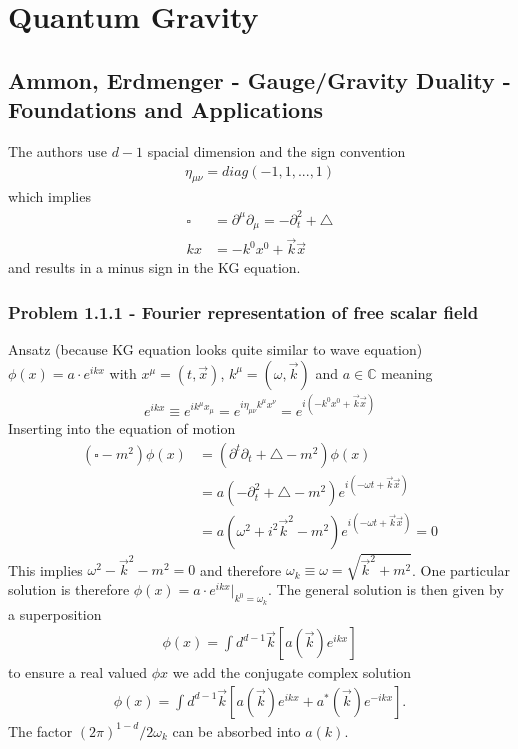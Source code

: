 \documentclass[10pt,a4paper]{article}
\theoremstyle{definition}
\begin{document}
\newpage
\section{Quantum Gravity}
\subsection{{\sc Ammon, Erdmenger} - Gauge/Gravity Duality - Foundations and Applications}
The authors use $d-1$ spacial dimension and the sign convention 
\begin{align}
\eta_{\mu\nu}=diag(-1,1,...,1)
\end{align}
which implies 
\begin{align}
    \square&=\partial^\mu\partial_\mu=-\partial_t^2+\triangle\\
    kx&=-k^0x^0+\vec{k}\vec{x}
\end{align}
and results in a minus sign in the KG equation.

\subsubsection{Problem 1.1.1 - Fourier representation of free scalar field}
Ansatz (because KG equation looks quite similar to wave equation) $\phi(x)=a\cdot e^{ikx}$ with $x^\mu=(t,\vec{x})$, $k^\mu=(\omega,\vec{k})$ and $a\in\mathbb{C}$ meaning 
\begin{align}
    e^{ikx}\equiv e^{ik^{\mu}x_{\mu}}=e^{i\eta_{\mu\nu}k^{\mu}x^{\nu}}=e^{i(-k^0x^0+\vec{k}\vec{x})}
\end{align}
Inserting into the equation of motion
\begin{align}
    (\square - m^2)\phi(x)&=(\partial^t\partial_t + \triangle - m^2)\phi(x)\\
    &=a(-\partial_t^2 + \triangle - m^2)e^{i(-\omega t+\vec{k}\vec{x})}\\
    &=a\left(\omega^2 + i^2\vec{k}^2 - m^2\right)e^{i(-\omega t+\vec{k}\vec{x})}=0 
\end{align}
This implies $\omega^2-\vec{k}^2-m^2=0$ and therefore $\omega_k\equiv\omega=\sqrt{\vec{k}^2+m^2}$. One particular solution is therefore $\phi(x)=a\cdot e^{ikx}|_{k^0=\omega_k}$. The general solution is then given by a superposition
\begin{align}
    \phi(x)=\int d^{d-1}\vec{k}\left[a(\vec{k})e^{ikx}\right]
\end{align}
to ensure a real valued $\phi{x}$ we add the conjugate complex solution
\begin{align}
    \phi(x)=\int d^{d-1}\vec{k}\left[a(\vec{k})e^{ikx} + a^*(\vec{k})e^{-ikx}\right].
\end{align}
The factor $(2\pi)^{1-d}/2\omega_k$ can be absorbed into $a(k)$.
\end{document}
